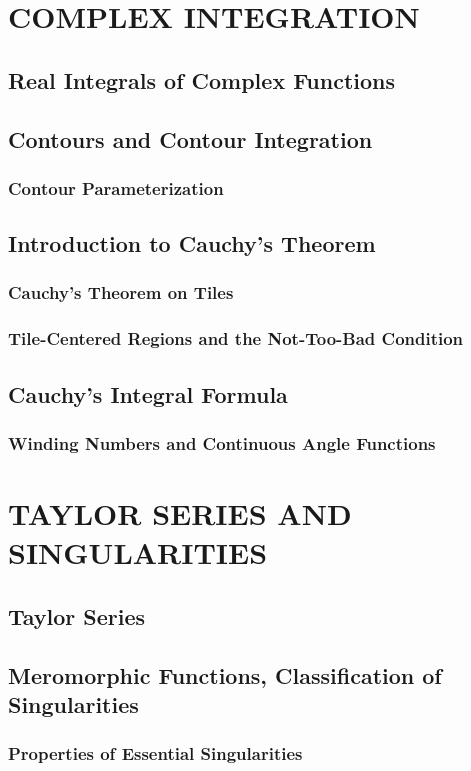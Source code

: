 \documentclass{refbook}
\begin{document}
\section{COMPLEX INTEGRATION}
\subsection{Real Integrals of Complex Functions}
\subsection{Contours and Contour Integration}
\subsubsection{Contour Parameterization}
\subsection{Introduction to Cauchy's Theorem}
\subsubsection{Cauchy's Theorem on Tiles}
\subsubsection{Tile-Centered Regions and the Not-Too-Bad Condition}
\subsection{Cauchy's
 Integral Formula}
\subsubsection{Winding Numbers and Continuous Angle Functions}

\section{TAYLOR SERIES AND SINGULARITIES}
\subsection
{Taylor Series}
\subsection{Meromorphic Functions, Classification of Singularities}
\subsubsection{Properties of Essential Singularities}
\end{document}
